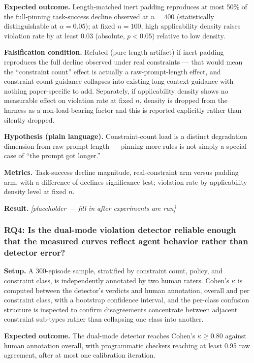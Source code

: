 \documentclass[11pt]{article}
\newcommand{\ph}{\textit{[placeholder --- fill in after experiments are run]}}
\begin{document}
\textbf{Expected outcome.} Length-matched inert padding reproduces at most 50\% of the full-pinning task-success decline observed at $n=400$ (statistically distinguishable at $\alpha=0.05$); at fixed $n=100$, high applicability density raises violation rate by at least 0.03 (absolute, $p<0.05$) relative to low density.

\textbf{Falsification condition.} Refuted (pure length artifact) if inert padding reproduces the full decline observed under real constraints --- that would mean the ``constraint count'' effect is actually a raw-prompt-length effect, and constraint-count guidance collapses into existing long-context guidance with nothing paper-specific to add. Separately, if applicability density shows no measurable effect on violation rate at fixed $n$, density is dropped from the harness as a non-load-bearing factor and this is reported explicitly rather than silently dropped.

\textbf{Hypothesis (plain language).} Constraint-count load is a distinct degradation dimension from raw prompt length --- pinning more rules is not simply a special case of ``the prompt got longer.''

\textbf{Metrics.} Task-success decline magnitude, real-constraint arm versus padding arm, with a difference-of-declines significance test; violation rate by applicability-density level at fixed $n$.

\textbf{Result.} \ph

\subsubsection{RQ4: Is the dual-mode violation detector reliable enough that the measured curves reflect agent behavior rather than detector error?}
\textbf{Setup.} A 300-episode sample, stratified by constraint count, policy, and constraint class, is independently annotated by two human raters. Cohen's $\kappa$ is computed between the detector's verdicts and human annotation, overall and per constraint class, with a bootstrap confidence interval, and the per-class confusion structure is inspected to confirm disagreements concentrate between adjacent constraint sub-types rather than collapsing one class into another.

\textbf{Expected outcome.} The dual-mode detector reaches Cohen's $\kappa \geq 0.80$ against human annotation overall, with programmatic checkers reaching at least 0.95 raw agreement, after at most one calibration iteration.
\end{document}
